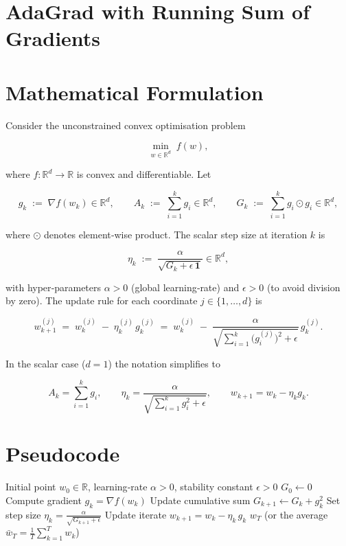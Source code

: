 \documentclass{article}
\newcommand{\R}{\mathbb{R}}
\begin{document}
\section*{AdaGrad with Running Sum of Gradients}

\section*{Mathematical Formulation}
Consider the unconstrained convex optimisation problem  

\[
\min_{w\in\R^{d}} \; f(w),
\]

where \(f:\R^{d}\rightarrow\R\) is convex and differentiable.  
Let  

\[
g_{k}\;:=\;\nabla f(w_{k})\in\R^{d},\qquad 
A_{k}\;:=\;\sum_{i=1}^{k} g_{i}\in\R^{d},
\qquad 
G_{k}\;:=\;\sum_{i=1}^{k} g_{i}\odot g_{i}\in\R^{d},
\]

where \(\odot\) denotes element‑wise product.  
The scalar step size at iteration \(k\) is  

\[
\eta_{k}\;:=\;\frac{\alpha}{\sqrt{G_{k}+\epsilon\,\mathbf{1}}}\in\R^{d},
\]

with hyper‑parameters  
\(\alpha>0\) (global learning‑rate) and \(\epsilon>0\) (to avoid division by zero).  
The update rule for each coordinate \(j\in\{1,\dots ,d\}\) is  

\[
w_{k+1}^{(j)} \;=\; w_{k}^{(j)}\;-\;\eta_{k}^{(j)}\, g_{k}^{(j)}
           \;=\; w_{k}^{(j)}\;-\;
           \frac{\alpha}{\sqrt{\sum_{i=1}^{k}\bigl(g_{i}^{(j)}\bigr)^{2}+\epsilon}}\,
           g_{k}^{(j)} .
\tag{1}
\]

In the scalar case (\(d=1\)) the notation simplifies to  

\[
A_{k}= \sum_{i=1}^{k} g_{i},\qquad 
\eta_{k}= \frac{\alpha}{\sqrt{\sum_{i=1}^{k} g_{i}^{2}+\epsilon}},\qquad
w_{k+1}= w_{k}-\eta_{k} g_{k}.
\tag{2}
\]

\section*{Pseudocode}
\begin{algorithm}[H]
\caption{AdaGrad (scalar version) with running sum of gradients}
\begin{algorithmic}[1]
\Require Initial point \(w_{0}\in\R\), learning‑rate \(\alpha>0\), stability constant \(\epsilon>0\)
\State \(G_{0}\gets 0\) 
    \State Compute gradient \(g_{k}= \nabla f(w_{k})\)
    \State Update cumulative sum \(G_{k+1}\gets G_{k}+g_{k}^{2}\)
    \State Set step size \(\displaystyle \eta_{k}= \frac{\alpha}{\sqrt{G_{k+1}+\epsilon}}\)
    \State Update iterate \(\displaystyle w_{k+1}= w_{k}-\eta_{k}\,g_{k}\)
\EndFor
\State \Return \(w_{T}\) (or the average \(\bar w_{T}= \tfrac{1}{T}\sum_{k=1}^{T} w_{k}\))
\end{algorithmic}
\end{algorithm}
\end{document}
